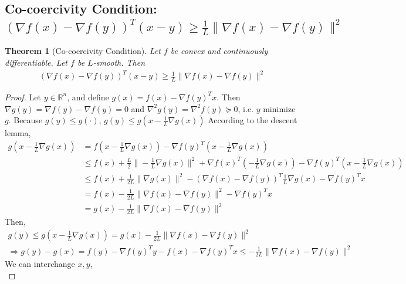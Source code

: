 \documentclass[11pt,a4paper]{article}
\newtheorem{theorem}{Theorem}
\begin{document}
\subsection{Co-coercivity Condition: $(\nabla f(x)-\nabla f(y))^T(x-y)\geq \frac{1}{L}\|\nabla f(x)-\nabla f(y)\|^2$}
\begin{theorem}[Co-coercivity Condition]
Let $f$ be convex and continuously differentiable. Let $f$ be $L$-smooth. Then
\begin{equation}
    \begin{aligned}
        (\nabla f(x)-\nabla f(y))^T(x-y)\geq \frac{1}{L}\|\nabla f(x)-\nabla f(y)\|^2
    \end{aligned}
    \nonumber
\end{equation}
\end{theorem}
\begin{proof}
Let $y\in \mathbb{R}^n$, and define $g(x)=f(x)-\nabla f(y)^Tx$. Then $\nabla g(y)=\nabla f(y)-\nabla f(y)=0$ and $\nabla^2 g(y)=\nabla^2 f(y)\succeq 0$, i.e. $y$ minimize $g$. Because $g(y)\leq g(\cdot)$, $g(y)\leq g(x-\frac{1}{L}\nabla g(x))$
According to the descent lemma,
\begin{equation}
    \begin{aligned}
        g(x-\frac{1}{L}\nabla g(x))&=f(x-\frac{1}{L}\nabla g(x))-\nabla f(y)^T(x-\frac{1}{L}\nabla g(x))\\
        &\leq f(x)+\frac{L}{2}\|-\frac{1}{L}\nabla g(x)\|^2+\nabla f(x)^T(-\frac{1}{L}\nabla g(x))-\nabla f(y)^T(x-\frac{1}{L}\nabla g(x))\\
        &\leq f(x)+\frac{1}{2L}\|\nabla g(x)\|^2-(\nabla f(x)-\nabla f(y))^T\frac{1}{L}\nabla g(x)-\nabla f(y)^Tx\\
        &=f(x)-\frac{1}{2L}\|\nabla f(x)-\nabla f(y)\|^2-\nabla f(y)^Tx\\
        &=g(x)-\frac{1}{2L}\|\nabla f(x)-\nabla f(y)\|^2
    \end{aligned}
    \nonumber
\end{equation}
Then,
\begin{equation}
    \begin{aligned}
        g(y)\leq g(x-\frac{1}{L}\nabla g(x))=g(x)-\frac{1}{2L}\|\nabla f(x)-\nabla f(y)\|^2\\
        \Rightarrow	g(y)-g(x)=f(y)-\nabla f(y)^Ty-f(x)-\nabla f(y)^Tx\leq -\frac{1}{2L}\|\nabla f(x)-\nabla f(y)\|^2
    \end{aligned}
    \nonumber
\end{equation}
We can interchange $x,y$,
\begin{equation}

\end{equation}
\end{proof}
\end{document}
